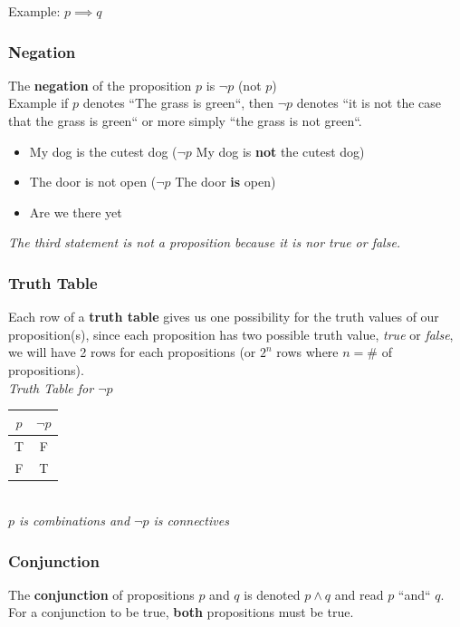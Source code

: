 \documentclass{article}
\begin{document}
Example: $ p \implies q $

\subsubsection{Negation}
The \textbf{negation} of the proposition $ p $ is $ \neg p $ (not $p$) \\


Example if $ p $ denotes ``The grass is green``, then $ \neg p $ denotes ``it is not the case that the grass is green`` or more simply ``the grass is not green``.\\


\begin{itemize}
\item My dog is the cutest dog  ($ \neg p $ My dog is \textbf{not} the cutest dog)
\item The door is not open ($ \neg p $ The door \textbf{is} open)
\item Are we there yet
\end{itemize}
\textit{The third statement is not a proposition because it is nor true or false.}

\clearpage

\subsubsection{Truth Table}
Each row of a \textbf{truth table} gives us one possibility for the truth values of our proposition(s), since each proposition has two possible truth value, \textit{true} or \textit{false}, we will have 2 rows for each propositions (or $ 2^n $ rows where $ n = \# $ of propositions). \\


\textit{Truth Table for $ \neg p $} 
\begin{tabular}{|c|c|}
\hline
$ p $ & $ \neg p $ \\
\hline
T & F \\
F & T \\
\hline
\end{tabular} \\
\textit{$ p $ is combinations and $ \neg p $ is connectives} \\


\subsubsection{Conjunction}
The \textbf{conjunction} of propositions $ p $ and $ q $ is denoted  $ p \land q $ and read $ p $ ``and`` $ q $.
For a conjunction to be true, \textbf{both} propositions must be true. \\
\end{document}
